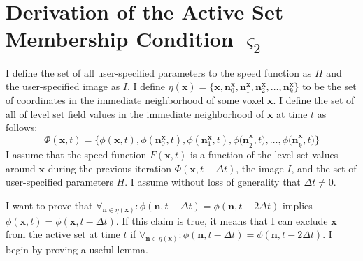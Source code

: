 \fancyhead[RO,LE]{\thepage}
\fancyfoot{} 
\chapter{Derivation of the Active Set Membership Condition $ \varsigma_{2} $ }
\label{app:temporal}

I define the set of all user-specified parameters to the speed function as $H$ and the user-specified image as $I$. I define $\eta \left({\mathbf x}\right)=\{{\mathbf x},{{\mathbf n}}^{{\mathbf x}}_0,{{\mathbf n}}^{{\mathbf x}}_1,{{\mathbf n}}^{{\mathbf x}}_2,\ldots ,{{\mathbf n}}^{{\mathbf x}}_k\}$ to be the set of coordinates in the immediate neighborhood of some voxel ${\mathbf x}$. I define the set of all of level set field values in the immediate neighborhood of ${\mathbf x}$ at time $t$ as follows:
\begin{equation}
\Phi \left({\mathbf x},t\right)=\{\phi\left({\mathbf x},t\right),\phi\left({{\mathbf n}}^{{\mathbf x}}_0,t\right),\phi\left({{\mathbf n}}^{{\mathbf x}}_1,t\right),{\phi({\mathbf n}}^{{\mathbf x}}_2,t),\ldots ,{\phi({\mathbf n}}^{{\mathbf x}}_k,t)\}
\end{equation}
I assume that the speed function $F({\mathbf x},t)$ is a function of the level set values around ${\mathbf x}$ during the previous iteration $\Phi \left({\mathbf x},t-\Delta t\right)$, the image $I$, and the set of user-specified parameters $H$. I assume without loss of generality that $\Delta t\ne 0$.

I want to prove that ${\forall }_{{\mathbf n}\in \eta \left({\mathbf x}\right)}:\phi\left({\mathbf n},t-\Delta t\right)=\phi({\mathbf n},t-2\Delta t)$ implies $\phi\left({\mathbf x},t\right)=\phi\left({\mathbf x},t-\Delta t\right)$. If this claim is true, it means that I can exclude $\mathbf{x}$ from the active set at time $t$ if ${\forall }_{{\mathbf n}\in \eta \left({\mathbf x}\right)}:\phi\left({\mathbf n},t-\Delta t\right)=\phi({\mathbf n},t-2\Delta t)$. I begin by proving a useful lemma.

\medskip

\medskip

\medskip

\medskip

